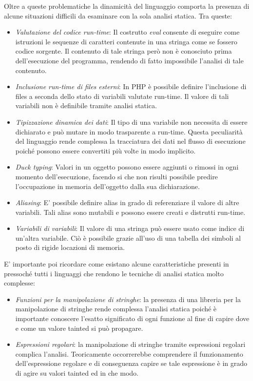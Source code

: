 Oltre a queste problematiche la dinamicità del linguaggio comporta la presenza di alcune situazioni difficili da esaminare con la sola analisi statica. Tra queste:
\begin{itemize}
\item \emph{Valutazione del codice run-time}: Il costrutto \emph{eval} consente di eseguire come istruzioni le sequenze di caratteri contenute in una stringa come se fossero codice sorgente. Il contenuto di tale stringa però non è conosciuto prima dell'esecuzione del programma, rendendo di fatto impossibile l'analisi di tale contenuto.
\item \emph{Inclusione run-time di files esterni}: In PHP è possibile definire l'inclusione di files a seconda dello stato di variabili valutate run-time. Il valore di tali variabili non è definibile tramite analisi statica.
\item \emph{Tipizzazione dinamica dei dati}: Il tipo di una variabile non necessita di essere dichiarato e può mutare in modo trasparente a run-time. Questa peculiarità del linguaggio rende complessa la tracciatura dei dati nel flusso di esecuzione poiché possono essere convertiti più volte in modo implicito.
\item \emph{Duck typing}: Valori in un oggetto possono essere aggiunti o rimossi in ogni momento dell'esecuzione, facendo si che non risulti possibile predire l'occupazione in memoria dell'oggetto dalla sua dichiarazione.
\item \emph{Aliasing}: E' possibile definire alias in grado di referenziare il valore di altre variabili. Tali alias sono mutabili e possono essere creati e distrutti run-time.
\item \emph{Variabili di variabili}: Il valore di una stringa può essere usato come indice di un'altra variabile. Ciò è possibile grazie all'uso di una tabella dei simboli al posto di rigide locazioni di memoria.
\end{itemize}

E' importante poi ricordare come esistano alcune caratteristiche presenti in pressoché tutti i linguaggi che rendono le tecniche di analisi statica molto complesse: 
\begin{itemize}
\item \emph{Funzioni per la manipolazione di stringhe}: la presenza di una libreria per la manipolazione di stringhe rende complessa l'analisi statica poiché è importante conoscere l'esatto significato di ogni funzione al fine di capire dove e come un valore tainted si può propagare.
\item \emph{Espressioni regolari}: la manipolazione di stringhe tramite espressioni regolari complica l'analisi. Teoricamente occorrerebbe comprendere il funzionamento dell'espressione regolare e di conseguenza capire se tale espressione è in grado di agire su valori tainted ed in che modo.
\end{itemize}

